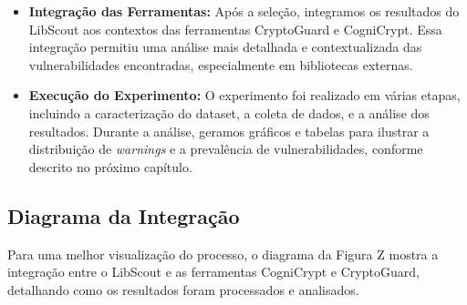 \begin{itemize}
\item \textbf{Integração das Ferramentas:} Após a seleção, integramos os resultados do LibScout aos contextos das ferramentas CryptoGuard e CogniCrypt. Essa integração permitiu uma análise mais detalhada e contextualizada das vulnerabilidades encontradas, especialmente em bibliotecas externas.

\item \textbf{Execução do Experimento:} O experimento foi realizado em várias etapas, incluindo a caracterização do dataset, a coleta de dados, e a análise dos resultados. Durante a análise, geramos gráficos e tabelas para ilustrar a distribuição de \textit{warnings} e a prevalência de vulnerabilidades, conforme descrito no próximo capítulo.

\end{itemize}

\subsection{Diagrama da Integração}

Para uma melhor visualização do processo, o diagrama da Figura Z mostra a integração entre o LibScout e as ferramentas CogniCrypt e CryptoGuard, detalhando como os resultados foram processados e analisados.